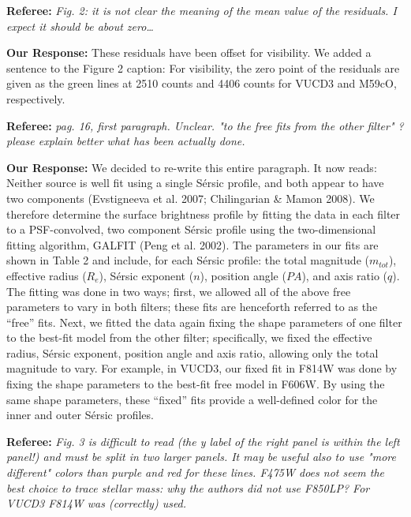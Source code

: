 \documentclass[11pt]{article}
\begin{document}
\vspace{0.5cm}

{\bf Referee:}  {\it Fig. 2: it is not clear the meaning of the mean value of the residuals. I expect it should be about zero…}

\vspace{0.2cm}
{\bf Our Response:} These residuals have been offset for visibility. We added a sentence to the Figure 2 caption: For visibility, the zero point of the residuals are given as the green lines at 2510 counts and 4406 counts for VUCD3 and M59cO, respectively. 

\vspace{0.5cm}

{\bf Referee:}  {\it pag. 16, first paragraph. Unclear. "to the free fits from the other filter" ? please explain better what has been actually done.}

\vspace{0.2cm}
{\bf Our Response:} We decided to re-write this entire paragraph. It now reads: Neither source is well fit using a single S\'ersic profile, and both appear to have two components (Evstigneeva et al. 2007; Chilingarian \& Mamon 2008). We therefore determine the surface brightness profile by fitting the data in each filter to a PSF-convolved, two component S\'ersic profile using the two-dimensional fitting algorithm, GALFIT (Peng et al. 2002). The parameters in our fits are shown in Table 2 and include, for each S\'ersic profile: the total magnitude ($m_{tot}$), effective radius ($R_e$), S\'ersic exponent ($n$), position angle ($PA$), and axis ratio ($q$). The fitting was done in two ways; first, we allowed all of the above free parameters to vary in both filters; these fits are henceforth referred to as the ``free'' fits. Next, we fitted the data again fixing the shape parameters of one filter to the best-fit model from the other filter; specifically, we fixed the effective radius, S\'ersic exponent, position angle and axis ratio, allowing only the total magnitude to vary.  For example, in VUCD3, our fixed fit in F814W was done by fixing the shape parameters to the best-fit free model in F606W. By using the same shape parameters, these ``fixed'' fits provide a well-defined color for the inner and outer S\'ersic profiles. 

\vspace{0.5cm}

{\bf Referee:}  {\it Fig. 3 is difficult to read (the y label of the right panel is within the left panel!) and must be split in two larger panels. It may be useful also to use "more different" colors than purple and red for these lines. F475W does not seem the best choice to trace stellar mass: why the authors did not use F850LP? For VUCD3 F814W was (correctly) used.}
\end{document}
